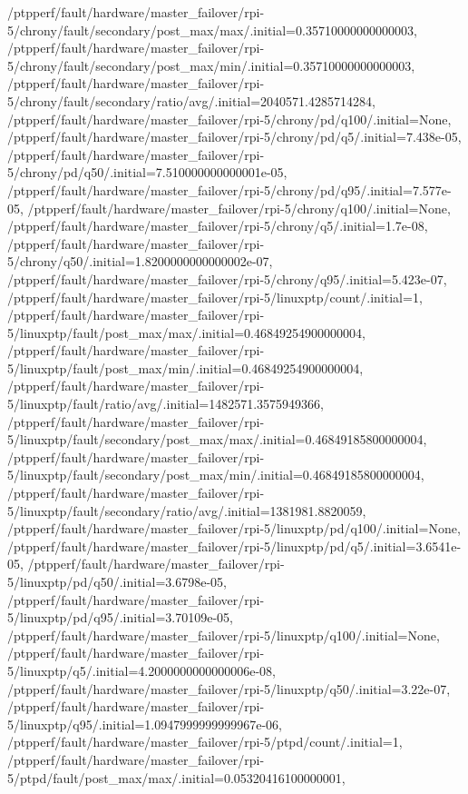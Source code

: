 {    /ptpperf/fault/hardware/master_failover/rpi-5/chrony/fault/secondary/post_max/max/.initial=0.35710000000000003,
    /ptpperf/fault/hardware/master_failover/rpi-5/chrony/fault/secondary/post_max/min/.initial=0.35710000000000003,
    /ptpperf/fault/hardware/master_failover/rpi-5/chrony/fault/secondary/ratio/avg/.initial=2040571.4285714284,
    /ptpperf/fault/hardware/master_failover/rpi-5/chrony/pd/q100/.initial=None,
    /ptpperf/fault/hardware/master_failover/rpi-5/chrony/pd/q5/.initial=7.438e-05,
    /ptpperf/fault/hardware/master_failover/rpi-5/chrony/pd/q50/.initial=7.510000000000001e-05,
    /ptpperf/fault/hardware/master_failover/rpi-5/chrony/pd/q95/.initial=7.577e-05,
    /ptpperf/fault/hardware/master_failover/rpi-5/chrony/q100/.initial=None,
    /ptpperf/fault/hardware/master_failover/rpi-5/chrony/q5/.initial=1.7e-08,
    /ptpperf/fault/hardware/master_failover/rpi-5/chrony/q50/.initial=1.8200000000000002e-07,
    /ptpperf/fault/hardware/master_failover/rpi-5/chrony/q95/.initial=5.423e-07,
    /ptpperf/fault/hardware/master_failover/rpi-5/linuxptp/count/.initial=1,
    /ptpperf/fault/hardware/master_failover/rpi-5/linuxptp/fault/post_max/max/.initial=0.46849254900000004,
    /ptpperf/fault/hardware/master_failover/rpi-5/linuxptp/fault/post_max/min/.initial=0.46849254900000004,
    /ptpperf/fault/hardware/master_failover/rpi-5/linuxptp/fault/ratio/avg/.initial=1482571.3575949366,
    /ptpperf/fault/hardware/master_failover/rpi-5/linuxptp/fault/secondary/post_max/max/.initial=0.46849185800000004,
    /ptpperf/fault/hardware/master_failover/rpi-5/linuxptp/fault/secondary/post_max/min/.initial=0.46849185800000004,
    /ptpperf/fault/hardware/master_failover/rpi-5/linuxptp/fault/secondary/ratio/avg/.initial=1381981.8820059,
    /ptpperf/fault/hardware/master_failover/rpi-5/linuxptp/pd/q100/.initial=None,
    /ptpperf/fault/hardware/master_failover/rpi-5/linuxptp/pd/q5/.initial=3.6541e-05,
    /ptpperf/fault/hardware/master_failover/rpi-5/linuxptp/pd/q50/.initial=3.6798e-05,
    /ptpperf/fault/hardware/master_failover/rpi-5/linuxptp/pd/q95/.initial=3.70109e-05,
    /ptpperf/fault/hardware/master_failover/rpi-5/linuxptp/q100/.initial=None,
    /ptpperf/fault/hardware/master_failover/rpi-5/linuxptp/q5/.initial=4.2000000000000006e-08,
    /ptpperf/fault/hardware/master_failover/rpi-5/linuxptp/q50/.initial=3.22e-07,
    /ptpperf/fault/hardware/master_failover/rpi-5/linuxptp/q95/.initial=1.0947999999999967e-06,
    /ptpperf/fault/hardware/master_failover/rpi-5/ptpd/count/.initial=1,
    /ptpperf/fault/hardware/master_failover/rpi-5/ptpd/fault/post_max/max/.initial=0.05320416100000001,
}
